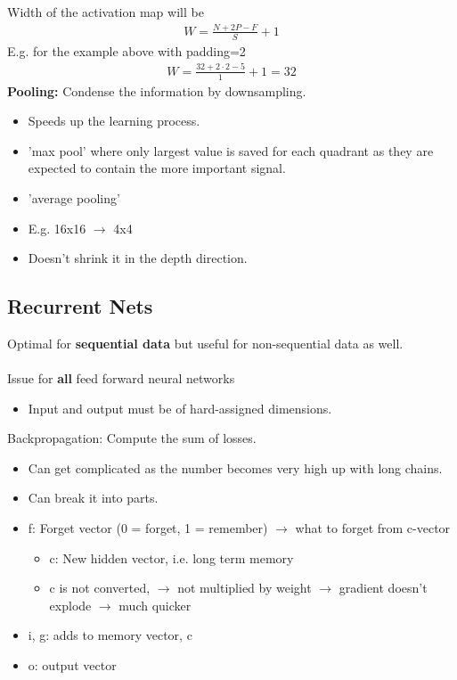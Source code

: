 \begin{multicols}{2}
\begin{itemize}
\end{itemize}
Width of the activation map will be
\begin{align*}
  W=\frac{N+2P-F}{S}+1
\end{align*}
E.g. for the example above with padding=2
\begin{align*}
 W=\frac{32+2\cdot2-5}{1}+1=32
\end{align*}
\textbf{Pooling:} Condense the information by downsampling.
\begin{itemize}
  \item Speeds up the learning process.
  \item 'max pool' where only largest value is saved for each quadrant as they are expected to contain the more important signal.
  \item 'average pooling'
  \item E.g. 16x16 $\rightarrow$ 4x4
  \item Doesn't shrink it in the depth direction.
\end{itemize}

\end{multicols}

\subsection{Recurrent Nets}
\begin{multicols}{2}
Optimal for \textbf{sequential data} but useful for non-sequential data as well.
\\ \\
Issue for \textbf{all} feed forward neural networks
\begin{itemize}
  \item Input and output must be of hard-assigned dimensions.
\end{itemize}
Backpropagation: Compute the sum of losses.
\begin{itemize}
  \item Can get complicated as the number becomes very high up with long chains.
  \item Can break it into parts.
\end{itemize}

\begin{itemize}
  \item f: Forget vector (0 = forget, 1 = remember) $\rightarrow$ what to forget from c-vector
  \begin{itemize}
    \item c: New hidden vector, i.e. long term memory
    \item c is not converted, $\rightarrow$ not multiplied by weight $\rightarrow$ gradient doesn't explode $\rightarrow$ much quicker
  \end{itemize}
  \item i, g: adds to memory vector, c
  \item o: output vector
\end{itemize}



\end{multicols}

